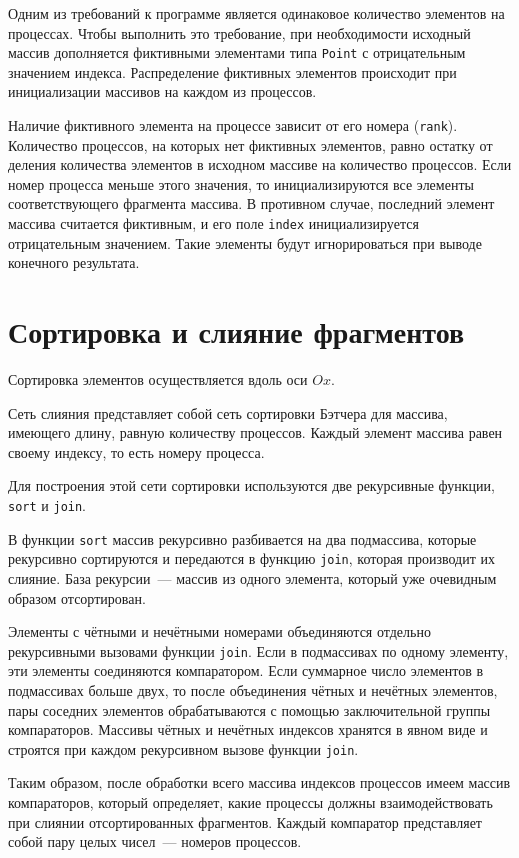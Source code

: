 \documentclass[oneside,final,14pt]{extreport}
\begin{document}
Одним из требований к программе является одинаковое количество элементов
на процессах. Чтобы выполнить это требование, при необходимости
исходный массив дополняется фиктивными элементами типа \texttt{Point} с
отрицательным значением индекса. Распределение фиктивных элементов происходит
при инициализации массивов на каждом из процессов.

Наличие фиктивного элемента на процессе зависит от его номера (\texttt{rank}).
Количество процессов, на которых нет фиктивных элементов, равно остатку от
деления количества элементов в исходном массиве на количество процессов.
Если номер процесса меньше этого значения, то инициализируются все элементы
соответствующего фрагмента массива. В противном случае, последний элемент
массива считается фиктивным, и его поле \texttt{index} инициализируется
отрицательным значением. Такие элементы будут игнорироваться при выводе
конечного результата.

\section*{Сортировка и слияние фрагментов}

Сортировка элементов осуществляется вдоль оси $Ox$.

Сеть слияния представляет собой сеть сортировки Бэтчера для массива, имеющего
длину, равную количеству процессов. Каждый элемент массива равен своему индексу,
то есть номеру процесса.

Для построения этой сети сортировки используются две рекурсивные функции,
\texttt{sort} и \texttt{join}.

В функции \texttt{sort} массив рекурсивно разбивается на два подмассива,
которые рекурсивно сортируются и передаются в функцию \texttt{join}, которая
производит их слияние. База рекурсии~--- массив из одного элемента,
который уже очевидным образом отсортирован.

Элементы с чётными и нечётными номерами объединяются отдельно рекурсивными
вызовами функции \texttt{join}. Если в подмассивах по одному элементу,
эти элементы соединяются компаратором. Если суммарное число элементов в
подмассивах больше двух, то после объединения чётных и нечётных элементов,
пары соседних элементов обрабатываются с помощью заключительной
группы компараторов. Массивы чётных и нечётных индексов хранятся в явном виде
и строятся при каждом рекурсивном вызове функции \texttt{join}.

Таким образом, после обработки всего массива индексов процессов имеем
массив компараторов, который определяет, какие процессы должны взаимодействовать
при слиянии отсортированных фрагментов. Каждый компаратор представляет собой
пару целых чисел~--- номеров процессов.
\end{document}
